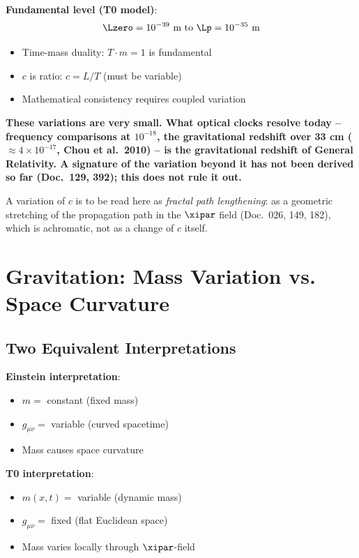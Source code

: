 	\textbf{Fundamental level (T0 model)}:
	\begin{equation}
		\Lzero = 10^{-39} \text{ m to } \Lp = 10^{-35} \text{ m}
	\end{equation}
	
	\begin{itemize}
		\item Time-mass duality: $T \cdot m = 1$ is fundamental
		\item $c$ is ratio: $c = L/T$ (must be variable)
		\item Mathematical consistency requires coupled variation
	\end{itemize}
	
	\textbf{These variations are very small. What optical clocks resolve today -- frequency comparisons at $10^{-18}$, the gravitational redshift over 33 cm ($\approx 4 \times 10^{-17}$, Chou et al.\ 2010) -- is the gravitational redshift of General Relativity. A signature of the variation beyond it has not been derived so far (Doc.~129, 392); this does not rule it out.}
	
	A variation of $c$ is to be read here as \emph{fractal path lengthening}: as a geometric stretching of the propagation path in the $\xipar$ field (Doc.~026, 149, 182), which is achromatic, not as a change of $c$ itself.
	
	\section{Gravitation: Mass Variation vs. Space Curvature}
	
	\subsection{Two Equivalent Interpretations}
	
	\textbf{Einstein interpretation}:
	\begin{itemize}
		\item $m = $ constant (fixed mass)
		\item $g_{\mu\nu} = $ variable (curved spacetime)
		\item Mass causes space curvature
	\end{itemize}
	
	\textbf{T0 interpretation}:
	\begin{itemize}
		\item $m(x,t) = $ variable (dynamic mass)
		\item $g_{\mu\nu} = $ fixed (flat Euclidean space)
		\item Mass varies locally through $\xipar$-field
	\end{itemize}
	
